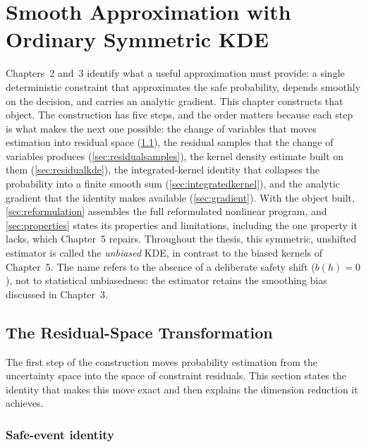 \section[Smooth Approximation with Ordinary Symmetric KDE]{Smooth Approximation with\\Ordinary Symmetric KDE}
\label{ch:unbiasedkde}

Chapters~2 and~3 identify what a useful approximation must provide:
a single deterministic
constraint that approximates the safe probability, depends smoothly on
the decision, and carries an analytic gradient. This chapter constructs that object. The construction has five
steps, and the order matters because each step is what makes the next
one possible: the change of variables that moves estimation into
residual space (\cref{sec:residualtransform}), the residual samples that
the change of variables produces (\cref{sec:residualsamples}), the
kernel density estimate built on them (\cref{sec:residualkde}), the
integrated-kernel identity that collapses the probability into a finite
smooth sum (\cref{sec:integratedkernel}), and the analytic gradient that
the identity makes available (\cref{sec:gradient}). With the object
built, \cref{sec:reformulation} assembles the full reformulated
nonlinear program, and \cref{sec:properties} states its properties and
limitations, including the one property it lacks,
which Chapter~5 repairs.
Throughout the thesis, this symmetric, unshifted estimator is called the
\emph{unbiased} KDE, in contrast to the biased kernels of Chapter~5. The
name refers to the absence of a deliberate safety shift ($b(h)=0$), not
to statistical unbiasedness: the estimator retains the smoothing bias
discussed in Chapter~3.

\subsection{The Residual-Space Transformation}
\label{sec:residualtransform}

The first step of the construction moves probability estimation from
the uncertainty space into the space of constraint residuals. This
section states the identity that makes this move exact and then explains
the dimension reduction it achieves.

\subsubsection{Safe-event identity}
\label{sec:residualidentity}


